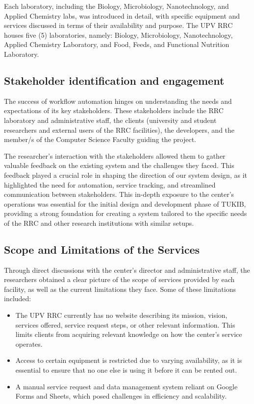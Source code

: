 Each laboratory, including the Biology, Microbiology, Nanotechnology, and Applied Chemistry labs, was introduced in detail, with specific equipment and services discussed in terms of their availability and purpose. The UPV RRC houses five (5) laboratories, namely: Biology, Microbiology, Nanotechnology, Applied Chemistry Laboratory, and Food, Feeds, and Functional Nutrition Laboratory.

\subsection{Stakeholder identification and engagement}
The success of workflow automation hinges on understanding the needs and expectations of its key stakeholders. These stakeholders include the RRC laboratory and administrative staff, the clients (university and student researchers and external users of the RRC facilities), the developers, and the member/s of the Computer Science Faculty guiding the project.

The researcher's interaction with the stakeholders allowed them to gather valuable feedback on the existing system and the challenges they faced. This feedback played a crucial role in shaping the direction of our system design, as it highlighted the need for automation, service tracking, and streamlined communication between stakeholders. This in-depth exposure to the center’s operations was essential for the initial design and development phase of TUKIB, providing a strong foundation for creating a system tailored to the specific needs of the RRC and other research institutions with similar setups.

\subsection{Scope and Limitations of the Services}
Through direct discussions with the center’s director and administrative staff, the researchers obtained a clear picture of the scope of services provided by each facility, as well as the current limitations they face. Some of these limitations included:

\begin{itemize}
	\item The UPV RRC currently has no website describing its mission, vision, services offered, service request steps, or other relevant information. This limits clients from acquiring relevant knowledge on how the center's service operates.
	\item Access to certain equipment is restricted due to varying availability, as it is essential to ensure that no one else is using it before it can be rented out.
	\item A manual service request and data management system reliant on Google Forms and Sheets, which posed challenges in efficiency and scalability.
\end{itemize}

